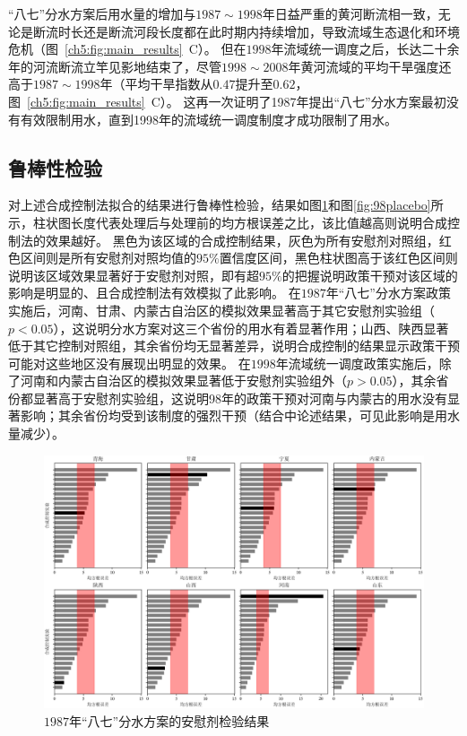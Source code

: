 “八七”分水方案后用水量的增加与$1987 \sim 1998$年日益严重的黄河断流相一致，无论是断流时长还是断流河段长度都在此时期内持续增加，导致流域生态退化和环境危机（图~\ref{ch5:fig:main_results}~C）。
但在$1998$年流域统一调度之后，长达二十余年的河流断流立竿见影地结束了，尽管$1998 \sim 2008$年黄河流域的平均干旱强度还高于$1987 \sim 1998$年（平均干旱指数从$0.47$提升至$0.62$，图~\ref{ch5:fig:main_results}~C）。
这再一次证明了1987年提出“八七”分水方案最初没有有效限制用水，直到1998年的流域统一调度制度才成功限制了用水。

\subsection{鲁棒性检验}

对上述合成控制法拟合的结果进行鲁棒性检验，结果如图\ref{fig:87placebo}和图\ref{fig:98placebo}所示，柱状图长度代表处理后与处理前的均方根误差之比，该比值越高则说明合成控制法的效果越好。
黑色为该区域的合成控制结果，灰色为所有安慰剂对照组，红色区间则是所有安慰剂对照均值的$95\%$置信度区间，黑色柱状图高于该红色区间则说明该区域效果显著好于安慰剂对照，即有超$95\%$的把握说明政策干预对该区域的影响是明显的、且合成控制法有效模拟了此影响。
在$1987$年“八七”分水方案政策实施后，河南、甘肃、内蒙古自治区的模拟效果显著高于其它安慰剂实验组（$p < 0.05$），这说明分水方案对这三个省份的用水有着显著作用；山西、陕西显著低于其它控制对照组，其余省份均无显著差异，说明合成控制的结果显示政策干预可能对这些地区没有展现出明显的效果。
在$1998$年流域统一调度政策实施后，除了河南和内蒙古自治区的模拟效果显著低于安慰剂实验组外（$p > 0.05$），其余省份都显著高于安慰剂实验组，这说明98年的政策干预对河南与内蒙古的用水没有显著影响；其余省份均受到该制度的强烈干预（结合中论述结果，可见此影响是用水量减少）。

\begin{figure}
    \includegraphics[width=0.9\linewidth]{img/ch5/ch5_rmse_87.png}
    \centering
    \caption{$1987$年“八七”分水方案的安慰剂检验结果}\label{fig:87placebo}
\end{figure}

